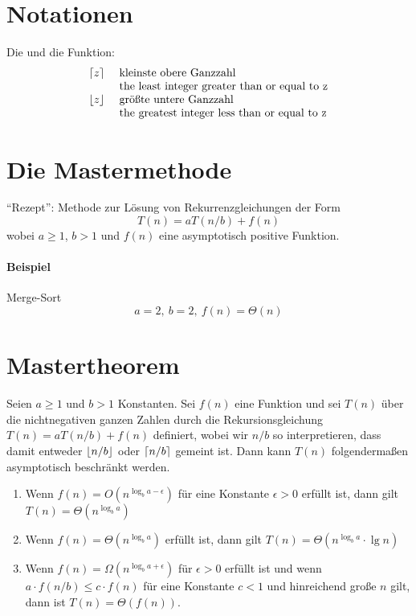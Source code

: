 \documentclass[a4paper]{scrartcl}
\begin{document}
\section{Notationen}
  Die  und die  Funktion:
  $$\begin{array}{cl}
  	\left\lceil z \right\rceil &\text{ kleinste obere Ganzzahl}\\
  	            &\text{ the least integer greater than or equal to z}\\
  	\left\lfloor z \right\rfloor &\text{ größte untere Ganzzahl}\\
  	            &\text{ the greatest integer less than or equal to z}
  \end{array}$$
  
\section{Die Mastermethode}
  "`Rezept"': Methode zur Lösung von Rekurrenzgleichungen der Form
  $$T(n)= aT(n/b)+f(n)$$
  wobei $a \geq 1$, $b>1$ und $f(n)$ eine asymptotisch positive Funktion.
  
\paragraph{Beispiel} Merge-Sort
	$$a=2,\ b=2,\ f(n)=\Theta(n)$$

\section{Mastertheorem}
	Seien $a \geq 1$ und $b>1$ Konstanten. Sei $f(n)$ eine Funktion und sei $T(n)$ über die nichtnegativen
	ganzen Zahlen durch die Rekursionsgleichung $T(n)= aT(n/b)+f(n)$ definiert, wobei wir $n/b$ so interpretieren,
	dass damit entweder $\left\lfloor n/b \right\rfloor$ oder $\left\lceil n/b \right\rceil$ gemeint ist. Dann kann $T(n)$ folgendermaßen asymptotisch
	beschränkt werden.
\begin{enumerate}
\item Wenn $f(n)=O(n^{\log_ba-\epsilon})$ für eine Konstante $\epsilon > 0$ erfüllt ist, dann gilt $T(n)=\Theta(n^{\log_ba})$
\item Wenn $f(n)=\Theta(n^{\log_ba})$ erfüllt ist, dann gilt $T(n) = \Theta(n^{\log_ba}\cdot \lg n)$
\item Wenn $f(n)=\Omega(n^{\log_ba+\epsilon})$ für $\epsilon > 0$ erfüllt ist und wenn $a\cdot f(n/b) \leq c \cdot f(n)$ für eine Konstante
			$c < 1$ und hinreichend große $n$ gilt, dann ist $T(n)=\Theta(f(n))$.
\end{enumerate}
\end{document}
